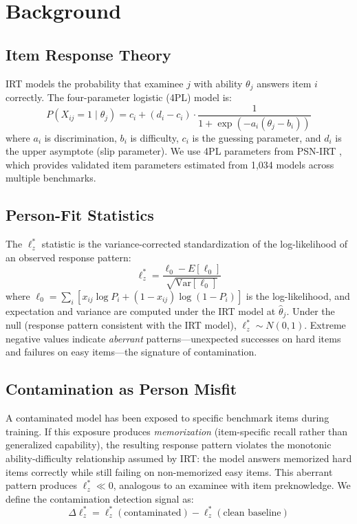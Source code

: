\documentclass[11pt,a4paper]{article}
\begin{document}
\section{Background}
\label{sec:background}

\subsection{Item Response Theory}

IRT models the probability that examinee $j$ with ability $\theta_j$ answers item $i$ correctly.
The four-parameter logistic (4PL) model is:
\begin{equation}
P(X_{ij}=1 \mid \theta_j) = c_i + (d_i - c_i) \cdot \frac{1}{1 + \exp(-a_i(\theta_j - b_i))}
\label{eq:4pl}
\end{equation}
where $a_i$ is discrimination, $b_i$ is difficulty, $c_i$ is the guessing parameter, and $d_i$ is the upper asymptote (slip parameter).
We use 4PL parameters from PSN-IRT \citep{psnirt2026}, which provides validated item parameters estimated from 1,034 models across multiple benchmarks.

\subsection{Person-Fit Statistics}

The $\ell_z^{*}$ statistic \citep{snijders2001} is the variance-corrected standardization of the log-likelihood of an observed response pattern:
\begin{equation}
\ell_z^{*} = \frac{\ell_0 - E[\ell_0]}{\sqrt{\text{Var}[\ell_0]}}
\end{equation}
where $\ell_0 = \sum_i [x_{ij} \log P_i + (1-x_{ij})\log(1-P_i)]$ is the log-likelihood, and expectation and variance are computed under the IRT model at $\hat{\theta}_j$.
Under the null (response pattern consistent with the IRT model), $\ell_z^{*} \sim N(0,1)$.
Extreme negative values indicate \emph{aberrant} patterns---unexpected successes on hard items and failures on easy items---the signature of contamination.

\subsection{Contamination as Person Misfit}

A contaminated model has been exposed to specific benchmark items during training.
If this exposure produces \emph{memorization} (item-specific recall rather than generalized capability), the resulting response pattern violates the monotonic ability-difficulty relationship assumed by IRT: the model answers memorized hard items correctly while still failing on non-memorized easy items.
This aberrant pattern produces $\ell_z^{*} \ll 0$, analogous to an examinee with item preknowledge.
We define the contamination detection signal as:
\begin{equation}
\Delta\ell_z^{*} = \ell_z^{*}(\text{contaminated}) - \ell_z^{*}(\text{clean baseline})
\end{equation}
\end{document}
